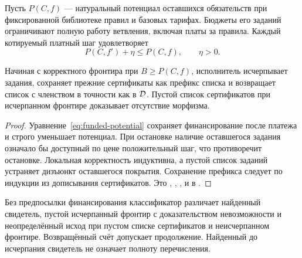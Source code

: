 Пусть $P(C,f)$ --- натуральный потенциал оставшихся обязательств при фиксированной библиотеке правил и базовых тарифах. Бюджеты его заданий ограничивают полную работу ветвления, включая платы за правила. Каждый котируемый платный шаг удовлетворяет
\begin{equation}\label{eq:funded-potential}
 P(C,f')+\eta\le P(C,f),\qquad\eta>0.
\end{equation}
\begin{theorem}\label{thm:funded-search}
Начиная с корректного фронтира при $B\ge P(C,f)$, исполнитель исчерпывает задания, сохраняет прежние сертификаты как префикс списка и возвращает список с членством в точности как в $\mathcal D$. Пустой список сертификатов при исчерпанном фронтире доказывает отсутствие морфизма.
\end{theorem}
\begin{proof}
Уравнение~\eqref{eq:funded-potential} сохраняет финансирование после платежа и строго уменьшает потенциал. При остановке наличие оставшегося задания означало бы доступный по цене положительный шаг, что противоречит остановке. Локальная корректность индуктивна, а пустой список заданий устраняет дизъюнкт оставшегося покрытия. Сохранение префикса следует по индукции из дописывания сертификатов. Это , , ,  и  в .
\end{proof}
Без предпосылки финансирования классификатор различает найденный свидетель, пустой исчерпанный фронтир с доказательством невозможности и неопределённый исход при пустом списке сертификатов и неисчерпанном фронтире. Возвращённый счёт допускает продолжение. Найденный до исчерпания свидетель не означает полноту перечисления.

